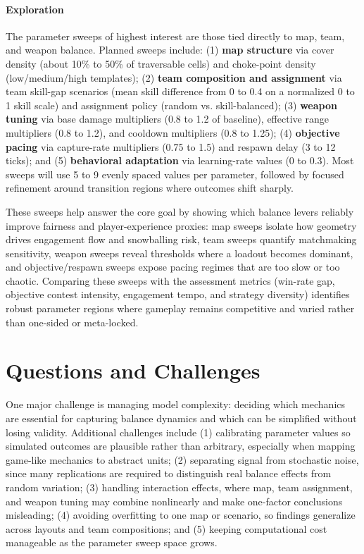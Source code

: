 \documentclass{assignment}
\begin{document}
\paragraph{Exploration}
The parameter sweeps of highest interest are those tied directly to map, team, and weapon balance. Planned sweeps include: (1) \textbf{map structure} via cover density (about 10\% to 50\% of traversable cells) and choke-point density (low/medium/high templates); (2) \textbf{team composition and assignment} via team skill-gap scenarios (mean skill difference from 0 to 0.4 on a normalized 0 to 1 skill scale) and assignment policy (random vs. skill-balanced); (3) \textbf{weapon tuning} via base damage multipliers (0.8 to 1.2 of baseline), effective range multipliers (0.8 to 1.2), and cooldown multipliers (0.8 to 1.25); (4) \textbf{objective pacing} via capture-rate multipliers (0.75 to 1.5) and respawn delay (3 to 12 ticks); and (5) \textbf{behavioral adaptation} via learning-rate values (0 to 0.3). Most sweeps will use 5 to 9 evenly spaced values per parameter, followed by focused refinement around transition regions where outcomes shift sharply.

These sweeps help answer the core goal by showing which balance levers reliably improve fairness and player-experience proxies: map sweeps isolate how geometry drives engagement flow and snowballing risk, team sweeps quantify matchmaking sensitivity, weapon sweeps reveal thresholds where a loadout becomes dominant, and objective/respawn sweeps expose pacing regimes that are too slow or too chaotic. Comparing these sweeps with the assessment metrics (win-rate gap, objective contest intensity, engagement tempo, and strategy diversity) identifies robust parameter regions where gameplay remains competitive and varied rather than one-sided or meta-locked.

\section{Questions and Challenges}
One major challenge is managing model complexity: deciding which mechanics are essential for capturing balance dynamics and which can be simplified without losing validity. Additional challenges include (1) calibrating parameter values so simulated outcomes are plausible rather than arbitrary, especially when mapping game-like mechanics to abstract units; (2) separating signal from stochastic noise, since many replications are required to distinguish real balance effects from random variation; (3) handling interaction effects, where map, team assignment, and weapon tuning may combine nonlinearly and make one-factor conclusions misleading; (4) avoiding overfitting to one map or scenario, so findings generalize across layouts and team compositions; and (5) keeping computational cost manageable as the parameter sweep space grows.
\end{document}
